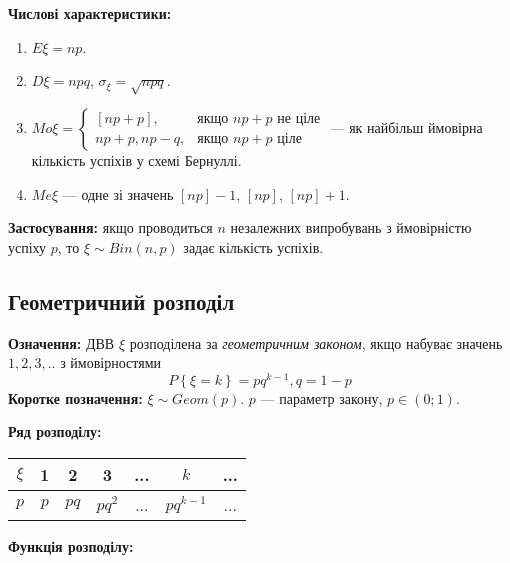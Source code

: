 \noindent\textbf{Числові характеристики:}
\begin{enumerate}
    \item $E\xi = np$.
    \item $D\xi = npq$, $\sigma_\xi = \sqrt{npq}$.
    \item ${Mo}\xi = \begin{cases}
        \left[np+p\right], & \text{якщо } np+p \text{ не ціле}\\
        np+p, np-q, & \text{якщо } np+p \text{ ціле}
    \end{cases}$ --- як найбільш ймовірна кількість успіхів у схемі Бернуллі.
    \item ${Me}\xi$ --- одне зі значень $\left[np\right] - 1$, $\left[np\right]$, $\left[np\right] + 1$.
\end{enumerate}

\noindent\textbf{Застосування:} якщо проводиться $n$ незалежних випробувань з ймовірністю успіху $p$, 
то $\xi \sim {Bin}(n, p)$ задає кількість успіхів.

\subsection{Геометричний розподіл}
\noindent\textbf{Означення:}
    ДВВ $\xi$ розподілена за \emph{геометричним законом}, 
    якщо набуває значень $1,2,3,..$ з ймовірностями \begin{equation}
        P\left\{\xi = k\right\} = pq^{k-1}, q = 1 - p
    \end{equation}
    \textbf{Коротке позначення:} $\xi \sim {Geom}(p)$.
    $p$ --- параметр закону, $p\in (0;1)$.

\noindent\textbf{Ряд розподілу:}

\begin{tabular}{c|c|c|c|c|c|c}
    $\xi$ & 1 & 2 & 3 & ... & $k$ & ... \\
    \hline
    $p$ & $p$ & $pq$ & $pq^2$ & ... & $pq^{k-1}$ & ...
\end{tabular}

\noindent\textbf{Функція розподілу:}

